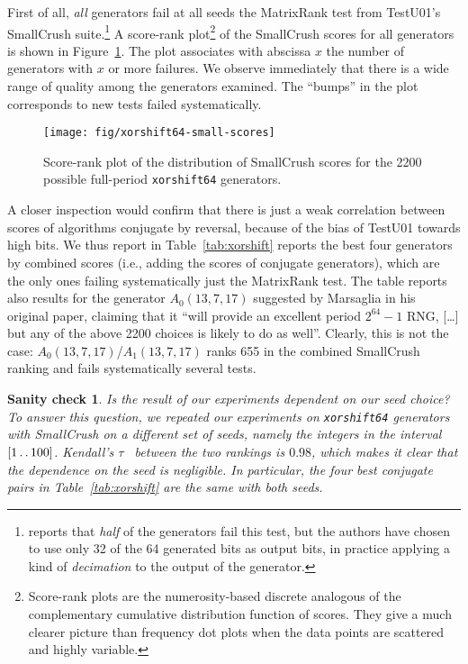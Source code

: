 \documentclass{acmsmalltr}
\newtheorem{sanity}{Sanity check}
\def\..{\,\mathpunct{\ldotp\ldotp}}
\newcommand{\xorshift}[1][]{\texttt{xorshift#1}\xspace}
\begin{document}
First of all, \emph{all} generators fail at all seeds the
MatrixRank test from TestU01's SmallCrush suite.\footnote{ reports that \emph{half} of
the generators fail this test, but the authors have chosen to use only 32 of
the 64 generated bits as output bits, in practice applying a kind of \emph{decimation}
to the output of the generator.}
A score-rank plot\footnote{Score-rank plots
are the numerosity-based discrete analogous of the complementary cumulative
distribution function of scores.
They give a much clearer picture than frequency dot plots when the data points are scattered and highly variable.} of the SmallCrush scores for all generators is shown in
Figure~\ref{fig:xorshiftsmallscores}. The plot associates with abscissa $x$ the
number of generators with $x$ or more failures.
We observe immediately that there is a wide range of quality among the
generators examined.
The ``bumps'' in the plot corresponds to new tests failed systematically.

\begin{figure}
\centering
\texttt{[image: fig/xorshift64-small-scores]}
\caption{\label{fig:xorshiftsmallscores}Score-rank plot of the distribution
of SmallCrush scores for the 2200 possible full-period \xorshift[64] generators.}
\end{figure}



A closer inspection would confirm that there is just a weak correlation
between scores of algorithms conjugate by reversal, because of the 
bias of TestU01 towards high bits. We thus
report in Table~\ref{tab:xorshift} reports the best four generators by combined
scores (i.e., adding the scores of conjugate generators), which are the only
ones failing systematically just the MatrixRank test.
The table reports also results for the generator $A_0(13,7,17)$ suggested by Marsaglia
in his original paper, claiming that it ``will provide an
excellent period $2^{64}-1$ RNG, [\ldots] but any of the above 2200 choices is
likely to do as well''. Clearly, this is not the case:
$A_0(13,7,17)$/$A_1(13,7,17)$ ranks 655 in the combined SmallCrush ranking and
fails systematically several tests. 








\begin{sanity} 
Is the result of our experiments dependent on our seed choice? To answer this
question, we repeated our experiments on \xorshift[64] generators with SmallCrush on a 
different set of seeds, namely the integers in the interval $[1\..100]$. 
Kendall's
$\tau$~\cite{KenNMRC,KenTTRP} between the two rankings is $0.98$, which makes it
clear that the dependence on the seed is negligible. In particular, the four best conjugate
pairs in Table~\ref{tab:xorshift} are the same with both seeds.
\end{sanity}
\end{document}
